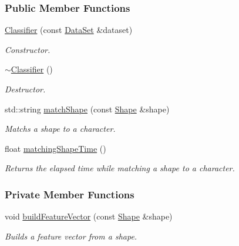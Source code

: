\subsubsection*{Public Member Functions}
\begin{CompactItemize}
\item 
\hyperlink{class_classifier_9e4bb9d0578609751dfb7cffb77b804f}{Classifier} (const \hyperlink{class_data_set}{DataSet} \&dataset)
\begin{CompactList}\small\item\em Constructor. \item\end{CompactList}\item 
\hyperlink{class_classifier_7831f2accc6c1e98ba11ba5ee67f6d0c}{$\sim$Classifier} ()
\begin{CompactList}\small\item\em Destructor. \item\end{CompactList}\item 
std::string \hyperlink{class_classifier_6fd6a8332d3188ac605ff452ab6dc9c2}{matchShape} (const \hyperlink{class_shape}{Shape} \&shape)
\begin{CompactList}\small\item\em Matchs a shape to a character. \item\end{CompactList}\item 
float \hyperlink{class_classifier_82e313296065218b1a01b5e44daa4c2f}{matchingShapeTime} ()
\begin{CompactList}\small\item\em Returns the elapsed time while matching a shape to a character. \item\end{CompactList}\end{CompactItemize}
\subsubsection*{Private Member Functions}
\begin{CompactItemize}
\item 
void \hyperlink{class_classifier_6c5a7ef6298b0f0d84873297f1e8c7e9}{buildFeatureVector} (const \hyperlink{class_shape}{Shape} \&shape)
\begin{CompactList}\small\item\em Builds a feature vector from a shape. \item\end{CompactList}\end{CompactItemize}
